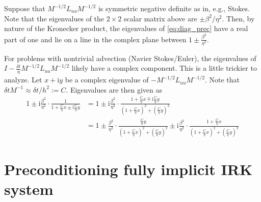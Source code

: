 \documentclass[a4paper,10pt]{article}
\begin{document}
%
Suppose that $M^{-1/2}L_{uu}M^{-1/2}$ is symmetric negative definite as in, e.g., Stokes.
Note that the eigenvalues of the $2\times 2$ scalar matrix above are $\pm\beta^2/\eta^2$.
Then, by nature of the Kronecker product, the eigenvalues of \eqref{eq:diag_prec} have
a real part of one and lie on a line in the complex plane between $1\pm\frac{\beta^2}{\eta^2}$.

For problems with nontrivial advection (Navier Stokes/Euler), the eigenvalues
of $I - \tfrac{\delta t}{\eta} M^{-1/2}L_{uu}M^{-1/2}$ likely have a complex component.
This is a little trickier to analyze. Let $x + \mathrm{i}y$ be a complex eigenvalue
of $-M^{-1/2}L_{uu}M^{-1/2}$. Note that $\delta tM^{-1} \approx \delta t/h^2 := C$.
Eigenvalues are then given as
%
\begin{align*}
1 \pm \mathrm{i}\frac{\beta^2}{\eta^2} \cdot
	\frac{1}{1 + \frac{C}{\eta}x \pm \mathrm{i}\frac{C}{\eta}y}
& = 1 \pm \mathrm{i}\frac{\beta^2}{\eta^2} \cdot
	\frac{1 + \frac{C}{\eta}x \mp \mathrm{i}\frac{C}{\eta}y}{(1 + \frac{C}{\eta}x)^2 +
		(\frac{C}{\eta}y)^2} \\
& = 1 \pm \frac{\beta^2}{\eta^2} \cdot
		\frac{\frac{C}{\eta}y}{(1 + \frac{C}{\eta}x)^2 + (\frac{C}{\eta}y)^2}
	\pm \mathrm{i}\frac{\beta^2}{\eta^2} \cdot
	\frac{1 + \frac{C}{\eta}x}{(1 + \frac{C}{\eta}x)^2 +
		(\frac{C}{\eta}y)^2}
\end{align*}
%

%






\newpage
\section{Preconditioning fully implicit IRK system}
\end{document}
